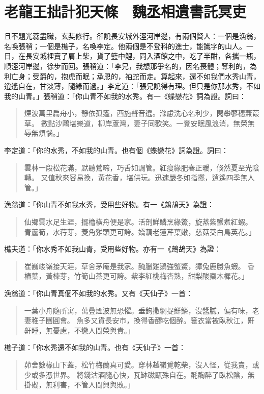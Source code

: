 
\chapter{老龍王拙計犯天條　魏丞相遺書託冥吏}

且不題光蕊盡職，玄奘修行。卻說長安城外涇河岸邊，有兩個賢人：一個是漁翁，名喚張稍；一個是樵子，名喚李定。他兩個是不登科的進士，能識字的山人。一日，在長安城裡賣了肩上柴，貨了籃中鯉，同入酒館之中，吃了半酣，各攜一瓶，順涇河岸邊，徐步而回。張稍道：「李兄，我想那爭名的，因名喪體；奪利的，為利亡身；受爵的，抱虎而眠；承恩的，袖蛇而走。算起來，還不如我們水秀山青，逍遙自在，甘淡薄，隨緣而過。」李定道：「張兄說得有理。但只是你那水秀，不如我的山青。」張稍道：「你山青不如我的水秀。有一《蝶戀花》詞為證。詞曰：
\begin{quote}
煙波萬里扁舟小，靜依孤篷，西施聲音遶。滌慮洗心名利少，閑攀蓼穗蒹葭草。
數點沙鷗堪樂道，柳岸蘆灣，妻子同歡笑。一覺安眠風浪消，無榮無辱無煩惱。」
\end{quote}

李定道：「你的水秀，不如我的山青。也有個《蝶戀花》詞為證。詞曰：
\begin{quote}
雲林一段松花滿，默聽鶯啼，巧舌如調管。紅瘦綠肥春正暖，倏然夏至光陰轉。
又值秋來容易換，黃花香，堪供玩。迅速嚴冬如指撚，逍遙四季無人管。」
\end{quote}

漁翁道：「你山青不如我水秀，受用些好物。有一《鷓鴣天》為證：
\begin{quote}
仙鄉雲水足生涯，擺櫓橫舟便是家。活剖鮮鱗烹綠鱉，旋蒸紫蟹煮紅蝦。
青蘆筍，水荇芽，菱角雞頭更可誇。嬌藕老蓮芹葉嫩，慈菇茭白鳥英花。」
\end{quote}

樵夫道：「你水秀不如我山青，受用些好物。亦有一《鷓鴣天》為證：
\begin{quote}
崔巍峻嶺接天涯，草舍茅庵是我家。醃臘雞鵝強蟹鱉，獐兔鹿勝魚蝦。
香椿葉，黃楝芽，竹筍山茶更可誇。紫李紅桃梅杏熟，甜梨酸棗木樨花。」
\end{quote}

漁翁道：「你山青真個不如我的水秀。又有《天仙子》一首：
\begin{quote}
一葉小舟隨所寓，萬疊煙波無恐懼。垂鉤撒網捉鮮鱗，沒醬膩，偏有味，老妻稚子團圓會。
魚多又貨長安市，換得香醪吃個醉。簑衣當被臥秋江，鼾鼾睡，無憂慮，不戀人間榮與貴。」
\end{quote}

樵子道：「你水秀還不如我的山青。也有《天仙子》一首：
\begin{quote}
茆舍數椽山下蓋，松竹梅蘭真可愛。穿林越嶺覓乾柴，沒人怪，從我賣，或少或多憑世界。
將錢沽酒隨心快，瓦缽磁甌殊自在。酕醄醉了臥松陰，無掛礙，無利害，不管人間興與敗。」
\end{quote}

